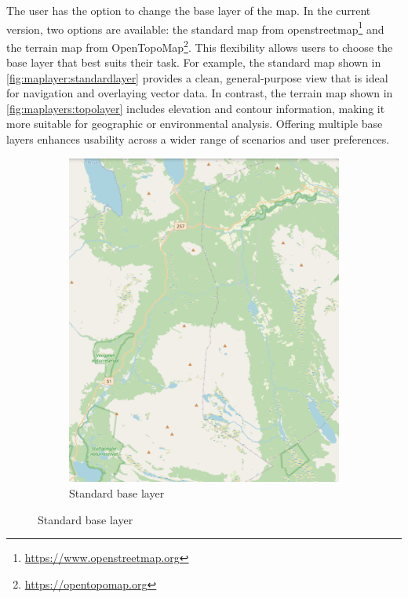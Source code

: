 The user has the option to change the base layer of the map. In the current version, two options are available: the standard map from \gls{openstreetmap}\footnote{\url{https://www.openstreetmap.org}} and the terrain map from OpenTopoMap\footnote{\url{https://opentopomap.org}}. This flexibility allows users to choose the base layer that best suits their task. For example, the standard map shown in \autoref{fig:maplayer:standardlayer} provides a clean, general-purpose view that is ideal for navigation and overlaying vector data. In contrast, the terrain map shown in \autoref{fig:maplayers:topolayer} includes elevation and contour information, making it more suitable for geographic or environmental analysis. Offering multiple base layers enhances usability across a wider range of scenarios and user preferences.

\begin{figure}[h]
     \centering
     \begin{subfigure}[b]{0.45\textwidth}
         \centering
         \includegraphics[width=\textwidth]{figures/base_layer_standard.pdf}
         \caption{Standard base layer}
         \label{fig:maplayer:standardlayer}

\end{subfigure}
\end{figure}
